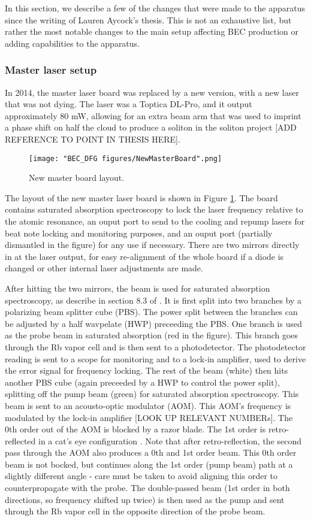 In this section, we describe a few of the changes that were made to the apparatus since the writing of Lauren Aycock's thesis\cite{AycockThesis}. This is not an exhaustive list, but rather the most notable changes to the main setup affecting BEC production or adding capabilities to the apparatus. 

\subsubsection{Master laser setup}
In 2014, the master laser board was replaced by a new version, with a new laser that was not dying. The laser was a Toptica DL-Pro, and it output approximately $80$ mW, allowing for an extra beam arm that was used to imprint a phase shift on half the cloud to produce a soliton in the soliton project [ADD REFERENCE TO POINT IN THESIS HERE]\cite{Aycock2017}.
\begin{figure}
	\texttt{[image: "BEC\_DFG figures/NewMasterBoard".png]}
\caption{New master board layout. }
\label{fig:NewMasterBoard}
\end{figure}

The layout of the new master laser board is shown in Figure \ref{fig:NewMasterBoard}. The board contains saturated absorption spectroscopy to lock the laser frequency relative to the atomic resonance, an ouput port to send to the cooling and repump lasers for beat note locking and monitoring purposes, and an ouput port (partially dismantled in the figure) for any use if necessary. There are two mirrors directly in at the laser output, for easy re-alignment of the whole board if a diode is changed or other internal laser adjustments are made. 

After hitting the two mirrors, the beam is used for saturated absorption spectroscopy, as describe in section 8.3 of \cite{Foot}. It is first split into two branches by a polarizing beam splitter cube (PBS). The power split between the branches can be adjusted by a half wavpelate (HWP) preceeding the PBS. One branch is used as the probe beam in saturated absorption (red in the figure). This branch goes through the Rb vapor cell and is then sent to a photodetector. The photodetector reading is sent to a scope for monitoring and to a lock-in amplifier, used to derive the error signal for frequency locking.  The rest of the beam (white) then hits another PBS cube (again preceeded by a HWP to control the power split), splitting off the pump beam (green) for saturated absorption spectroscopy. This beam is sent to an acousto-optic modulator (AOM). This AOM's frequency is modulated by the lock-in amplifier [LOOK UP RELEVANT NUMBERs]. The 0th order out of the AOM is blocked by a razor blade. The 1st order is retro-reflected in a cat's eye configuration \cite{Donley2005}. Note that after retro-reflection, the second pass through the AOM also produces a 0th and 1st order beam. This 0th order beam is not bocked, but continues along the 1st order (pump beam) path at a slightly different angle - care must be taken to avoid aligning this order to counterpropagate with the probe.   The double-passed beam (1st order in both directions, so frequency shifted up twice) is then used as the pump and sent through the Rb vapor cell in the opposite direction of the probe beam.  


